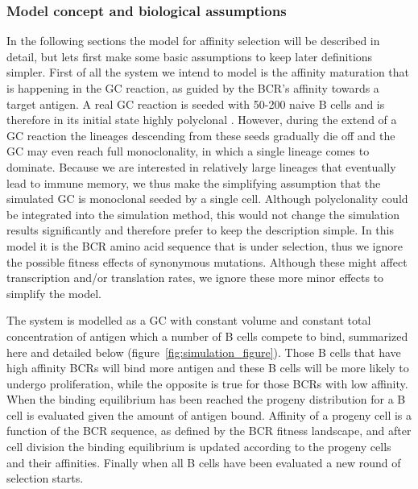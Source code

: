 \subsubsection{Model concept and biological assumptions}
In the following sections the model for affinity selection will be described in detail, but lets first make some basic assumptions to keep later definitions simpler.
First of all the system we intend to model is the affinity maturation that is happening in the GC reaction, as guided by the BCR's affinity towards a target antigen.
A real GC reaction is seeded with 50-200 naive B cells and is therefore in its initial state highly polyclonal \cite{tas2016visualizing}.
However, during the extend of a GC reaction the lineages descending from these seeds gradually die off \cite{tas2016visualizing} and the GC may even reach full monoclonality, in which a single lineage comes to dominate.
Because we are interested in relatively large lineages that eventually lead to immune memory, we thus make the simplifying assumption that the simulated GC is monoclonal seeded by a single cell.
Although polyclonality could be integrated into the simulation method, this would not change the simulation results significantly and therefore prefer to keep the description simple.
In this model it is the BCR amino acid sequence that is under selection, thus we ignore the possible fitness effects of synonymous mutations.
Although these might affect transcription and/or translation rates, we ignore these more minor effects to simplify the model.

The system is modelled as a GC with constant volume and constant total concentration of antigen which a number of B cells compete to bind, summarized here and detailed below (figure~\ref{fig:simulation_figure}).
Those B cells that have high affinity BCRs will bind more antigen and these B cells will be more likely to undergo proliferation, while the opposite is true for those BCRs with low affinity.
When the binding equilibrium has been reached the progeny distribution for a B cell is evaluated given the amount of antigen bound.
Affinity of a progeny cell is a function of the BCR sequence, as defined by the BCR fitness landscape, and after cell division the binding equilibrium is updated according to the progeny cells and their affinities.
Finally when all B cells have been evaluated a new round of selection starts.

